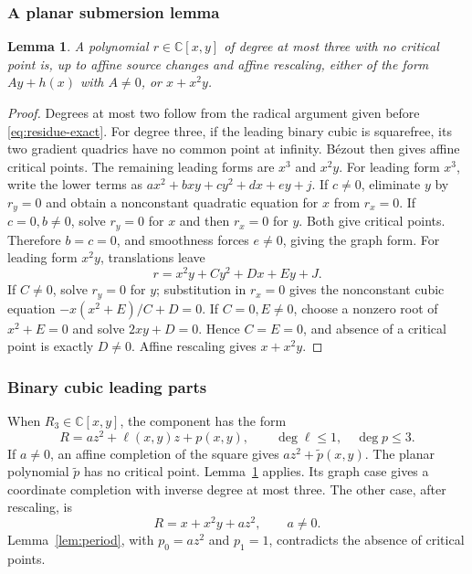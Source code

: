 \documentclass[11pt,reqno]{amsart}
\numberwithin{equation}{section}
\theoremstyle{plain}
\newtheorem{lemma}[theorem]{Lemma}
\theoremstyle{definition}
\theoremstyle{remark}
\newcommand{\C}{\mathbb C}
\begin{document}
\subsubsection{A planar submersion lemma}
\begin{lemma}\label{lem:planar-submersion}
A polynomial $r\in\C[x,y]$ of degree at most three with no critical point is, up to affine source changes and affine rescaling, either of the form $Ay+h(x)$ with $A\ne0$, or $x+x^2y$.
\end{lemma}
\begin{proof}
Degrees at most two follow from the radical argument given before \eqref{eq:residue-exact}. For degree three, if the leading binary cubic is squarefree, its two gradient quadrics have no common point at infinity. B\'ezout then gives affine critical points. The remaining leading forms are $x^3$ and $x^2y$.
For leading form $x^3$, write the lower terms as $ax^2+bxy+cy^2+dx+ey+j$. If $c\ne0$, eliminate $y$ by $r_y=0$ and obtain a nonconstant quadratic equation for $x$ from $r_x=0$. If $c=0,b\ne0$, solve $r_y=0$ for $x$ and then $r_x=0$ for $y$. Both give critical points. Therefore $b=c=0$, and smoothness forces $e\ne0$, giving the graph form.
For leading form $x^2y$, translations leave
\[
r=x^2y+Cy^2+Dx+Ey+J.
\]
If $C\ne0$, solve $r_y=0$ for $y$; substitution in $r_x=0$ gives the nonconstant cubic equation $-x(x^2+E)/C+D=0$. If $C=0,E\ne0$, choose a nonzero root of $x^2+E=0$ and solve $2xy+D=0$. Hence $C=E=0$, and absence of a critical point is exactly $D\ne0$. Affine rescaling gives $x+x^2y$.
\end{proof}

\subsubsection{Binary cubic leading parts}
When $R_3\in\C[x,y]$, the component has the form
\begin{equation}\label{eq:binary-scalar}
R=az^2+\ell(x,y)z+p(x,y),\qquad \deg\ell\le1,\quad\deg p\le3.
\end{equation}
If $a\ne0$, an affine completion of the square gives $az^2+\widetilde p(x,y)$. The planar polynomial $\widetilde p$ has no critical point. Lemma~\ref{lem:planar-submersion} applies. Its graph case gives a coordinate completion with inverse degree at most three. The other case, after rescaling, is
\[
R=x+x^2y+az^2,\qquad a\ne0.
\]
Lemma~\ref{lem:period}, with $p_0=az^2$ and $p_1=1$, contradicts the absence of critical points.
\end{document}
